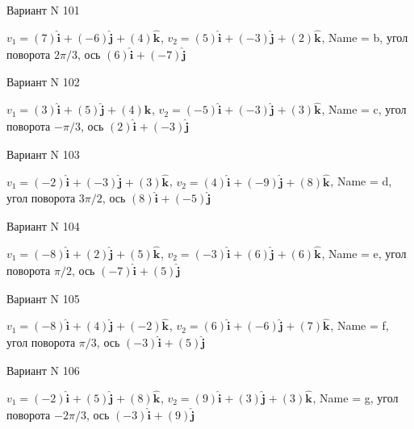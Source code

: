 \documentclass[11pt]{report}
\begin{document}
Вариант N 101

$v_1 = \left(7\right)\mathbf{\hat{i}_{}} + \left(-6\right)\mathbf{\hat{j}_{}} + \left(4\right)\mathbf{\hat{k}_{}}$, $v_2 = \left(5\right)\mathbf{\hat{i}_{}} + \left(-3\right)\mathbf{\hat{j}_{}} + \left(2\right)\mathbf{\hat{k}_{}}$, Name = b, угол поворота $2 \pi / 3$, ось $\left(6\right)\mathbf{\hat{i}_{}} + \left(-7\right)\mathbf{\hat{j}_{}}$

Вариант N 102

$v_1 = \left(3\right)\mathbf{\hat{i}_{}} + \left(5\right)\mathbf{\hat{j}_{}} + \left(4\right)\mathbf{\hat{k}_{}}$, $v_2 = \left(-5\right)\mathbf{\hat{i}_{}} + \left(-3\right)\mathbf{\hat{j}_{}} + \left(3\right)\mathbf{\hat{k}_{}}$, Name = c, угол поворота $- \pi / 3$, ось $\left(2\right)\mathbf{\hat{i}_{}} + \left(-3\right)\mathbf{\hat{j}_{}}$

Вариант N 103

$v_1 = \left(-2\right)\mathbf{\hat{i}_{}} + \left(-3\right)\mathbf{\hat{j}_{}} + \left(3\right)\mathbf{\hat{k}_{}}$, $v_2 = \left(4\right)\mathbf{\hat{i}_{}} + \left(-9\right)\mathbf{\hat{j}_{}} + \left(8\right)\mathbf{\hat{k}_{}}$, Name = d, угол поворота $3 \pi / 2$, ось $\left(8\right)\mathbf{\hat{i}_{}} + \left(-5\right)\mathbf{\hat{j}_{}}$

Вариант N 104

$v_1 = \left(-8\right)\mathbf{\hat{i}_{}} + \left(2\right)\mathbf{\hat{j}_{}} + \left(5\right)\mathbf{\hat{k}_{}}$, $v_2 = \left(-3\right)\mathbf{\hat{i}_{}} + \left(6\right)\mathbf{\hat{j}_{}} + \left(6\right)\mathbf{\hat{k}_{}}$, Name = e, угол поворота $\pi / 2$, ось $\left(-7\right)\mathbf{\hat{i}_{}} + \left(5\right)\mathbf{\hat{j}_{}}$

Вариант N 105

$v_1 = \left(-8\right)\mathbf{\hat{i}_{}} + \left(4\right)\mathbf{\hat{j}_{}} + \left(-2\right)\mathbf{\hat{k}_{}}$, $v_2 = \left(6\right)\mathbf{\hat{i}_{}} + \left(-6\right)\mathbf{\hat{j}_{}} + \left(7\right)\mathbf{\hat{k}_{}}$, Name = f, угол поворота $\pi / 3$, ось $\left(-3\right)\mathbf{\hat{i}_{}} + \left(5\right)\mathbf{\hat{j}_{}}$

Вариант N 106

$v_1 = \left(-2\right)\mathbf{\hat{i}_{}} + \left(5\right)\mathbf{\hat{j}_{}} + \left(8\right)\mathbf{\hat{k}_{}}$, $v_2 = \left(9\right)\mathbf{\hat{i}_{}} + \left(3\right)\mathbf{\hat{j}_{}} + \left(3\right)\mathbf{\hat{k}_{}}$, Name = g, угол поворота $- 2 \pi / 3$, ось $\left(-3\right)\mathbf{\hat{i}_{}} + \left(9\right)\mathbf{\hat{j}_{}}$
\end{document}
